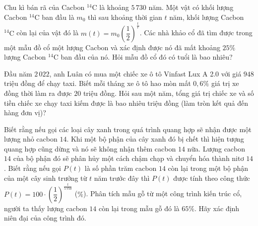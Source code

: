 \begin{ex}%
	Chu kì bán rã của Cacbon $^{14}\mathrm{C}$ là khoảng $5\,730$ năm. Một vật có khối lượng Cacbon $^{14}\mathrm{C}$ ban đầu là $m_0$ thì sau khoảng thời gian $t$ năm, khối lượng Cacbon $^{14}\mathrm{C}$ còn lại của vật đó là $m(t)=m_0 \left(\dfrac{1}{2}\right)^{\tfrac{t}{T}}$. Các nhà khảo cổ đã tìm được trong một mẫu đồ  cổ một lượng Cacbon và xác định được nó đã mất khoảng $25\%$ lượng Cacbon $^{14}\mathrm{C}$ ban đầu của nó. Hỏi mẫu đồ cổ đó có tuổi là bao nhiêu?
\end{ex}

\begin{ex}%
	Đầu năm $2\,022$, anh Luân có mua một chiếc xe ô tô Vinfast Lux A 2.0 với giá $948$ triệu đồng để chạy taxi. Biết mỗi tháng xe ô tô hao mòn mất $0{,}6\%$ giá trị xe đồng  thời làm ra được $20$ triệu đồng. Hỏi sau một năm, tổng giá trị chiếc xe và số tiền chiếc xe chạy taxi kiếm được là bao nhiêu triệu đồng (làm tròn kết quả đến hàng đơn vị)?
\end{ex}

\begin{ex}%
	Biết rằng nếu gọi các loại cây xanh trong quá trình quang hợp sẽ nhận được một lượng nhỏ cacbon $14$. Khi một bộ phận của cây xanh đó bị chết thì hiện tượng quang hợp cũng dừng và  nó sẽ không nhận thêm cacbon $14$ nữa. Lượng cacbon $14$ của bộ phận đó sẽ phân hủy một cách chậm chạp và chuyển hóa thành nitơ $14$. Biết rằng nếu gọi $P(t)$ là số phần trăm cacbon $14$ còn lại trong một bộ phận của một cây sinh trưởng từ $t$ năm trước đây thì $P(t)$ được tính theo công thức $P(t)=100\cdot \left(\dfrac{1}{2}\right)^{\tfrac{t}{5\,750}}$ ($\%$). Phân tích mẫu gỗ từ một công trình kiến trúc cổ, người ta thấy lượng cacbon $14$ còn lại trong mẫu gỗ đó là $65\%$. Hãy xác định niên đại của công trình đó.
\end{ex}

